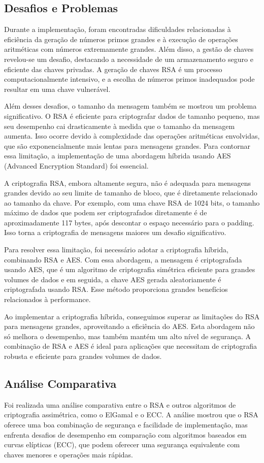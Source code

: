 \documentclass[a4paper,12pt]{article}
\begin{document}
\subsection*{Desafios e Problemas}
Durante a implementação, foram encontradas dificuldades relacionadas à eficiência da geração de números primos grandes e à execução de operações aritméticas com números extremamente grandes. Além disso, a gestão de chaves revelou-se um desafio, destacando a necessidade de um armazenamento seguro e eficiente das chaves privadas. A geração de chaves RSA é um processo computacionalmente intensivo, e a escolha de números primos inadequados pode resultar em uma chave vulnerável.

Além desses desafios, o tamanho da mensagem também se mostrou um problema significativo. O RSA é eficiente para criptografar dados de tamanho pequeno, mas seu desempenho cai drasticamente à medida que o tamanho da mensagem aumenta. Isso ocorre devido à complexidade das operações aritméticas envolvidas, que são exponencialmente mais lentas para mensagens grandes. Para contornar essa limitação, a implementação de uma abordagem híbrida usando AES (Advanced Encryption Standard) foi essencial.

A criptografia RSA, embora altamente segura, não é adequada para mensagens grandes devido ao seu limite de tamanho de bloco, que é diretamente relacionado ao tamanho da chave. Por exemplo, com uma chave RSA de 1024 bits, o tamanho máximo de dados que podem ser criptografados diretamente é de aproximadamente 117 bytes, após descontar o espaço necessário para o padding. Isso torna a criptografia de mensagens maiores um desafio significativo.

Para resolver essa limitação, foi necessário adotar a criptografia híbrida, combinando RSA e AES. Com essa abordagem, a mensagem é criptografada usando AES, que é um algoritmo de criptografia simétrica eficiente para grandes volumes de dados e em seguida, a chave AES gerada aleatoriamente é criptografada usando RSA. Esse método proporciona grandes benefícios relacionados à performance.

Ao implementar a criptografia híbrida, conseguimos superar as limitações do RSA para mensagens grandes, aproveitando a eficiência do AES. Esta abordagem não só melhora o desempenho, mas também mantém um alto nível de segurança. A combinação de RSA e AES é ideal para aplicações que necessitam de criptografia robusta e eficiente para grandes volumes de dados.

\subsection*{Análise Comparativa}
Foi realizada uma análise comparativa entre o RSA e outros algoritmos de criptografia assimétrica, como o ElGamal e o ECC. A análise mostrou que o RSA oferece uma boa combinação de segurança e facilidade de implementação, mas enfrenta desafios de desempenho em comparação com algoritmos baseados em curvas elípticas (ECC), que podem oferecer uma segurança equivalente com chaves menores e operações mais rápidas.
\end{document}

